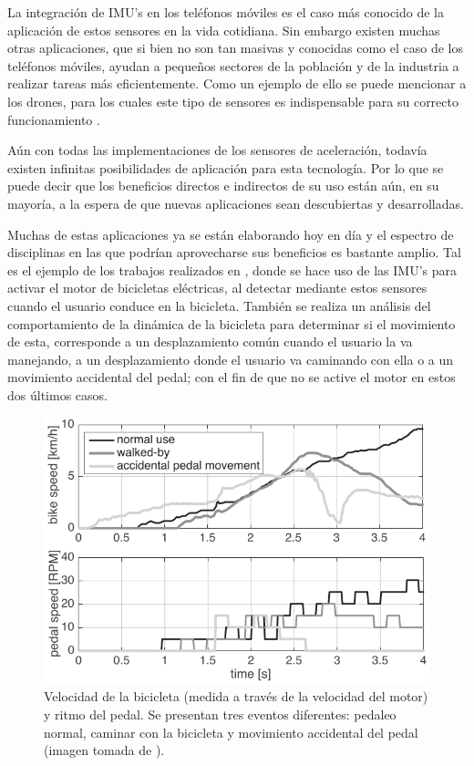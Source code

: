 La integración de IMU’s en los teléfonos móviles es el caso más conocido de la aplicación de estos sensores en la vida cotidiana. 
Sin embargo existen muchas otras aplicaciones, que si bien no son tan masivas y conocidas como el caso de los teléfonos móviles, ayudan a pequeños sectores de la población y de la industria a realizar tareas más eficientemente. 
Como un ejemplo de ello se puede mencionar a los drones, para los cuales este tipo de sensores es indispensable para su correcto funcionamiento \cite{6852167}.

Aún con todas las implementaciones de los sensores de aceleración, todavía existen infinitas posibilidades de aplicación para esta tecnología. 
Por lo que se puede decir que los beneficios directos e indirectos de su uso están aún, en su mayoría, a la espera de que nuevas aplicaciones sean descubiertas y desarrolladas.
 
Muchas de estas aplicaciones ya se están elaborando hoy en día y el espectro de disciplinas en las que podrían aprovecharse sus beneficios es bastante amplio. 
Tal es el ejemplo de los trabajos realizados en \cite{7457644}, donde se hace uso de las IMU’s para activar el motor de bicicletas eléctricas, al detectar mediante estos sensores cuando el usuario conduce en la bicicleta.
También se realiza un análisis del comportamiento de la dinámica de la bicicleta para determinar si el movimiento de esta, corresponde a un desplazamiento común cuando el usuario la va manejando, a un desplazamiento donde el usuario va caminando con ella o a un movimiento accidental del pedal; con el fin de que no se active el motor en estos dos últimos casos.  

\begin{figure}[H]
\centering
\includegraphics[scale=0.7]{3.png}
\caption{Velocidad de la bicicleta (medida a través de la velocidad del motor) y ritmo del pedal. Se presentan tres eventos diferentes: pedaleo normal, caminar con la bicicleta y movimiento accidental del pedal (imagen tomada de \cite{7457644}).} 
\label{3}
\end{figure}

